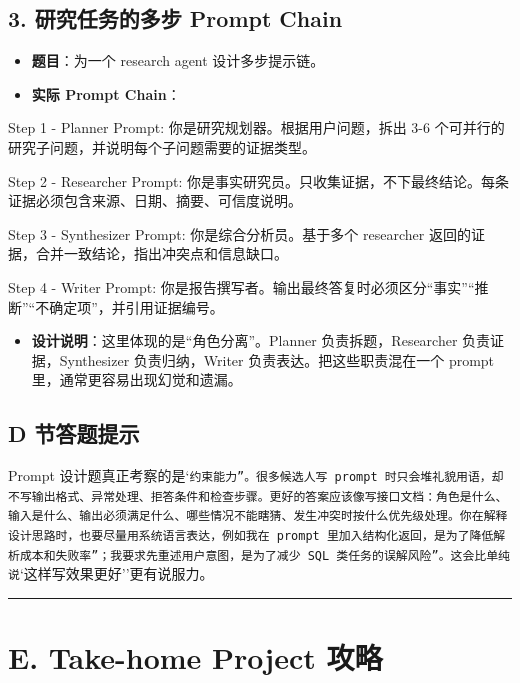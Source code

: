 \subsection{3. 研究任务的多步 Prompt Chain}
\begin{itemize}[leftmargin=2em]
\item \textbf{题目}：为一个 research agent 设计多步提示链。
\item \textbf{实际 Prompt Chain}：
\end{itemize}

\begin{codeblock}
Step 1 - Planner Prompt:
你是研究规划器。根据用户问题，拆出 3-6 个可并行的研究子问题，并说明每个子问题需要的证据类型。

Step 2 - Researcher Prompt:
你是事实研究员。只收集证据，不下最终结论。每条证据必须包含来源、日期、摘要、可信度说明。

Step 3 - Synthesizer Prompt:
你是综合分析员。基于多个 researcher 返回的证据，合并一致结论，指出冲突点和信息缺口。

Step 4 - Writer Prompt:
你是报告撰写者。输出最终答复时必须区分``事实''``推断''``不确定项''，并引用证据编号。
\end{codeblock}

\begin{itemize}[leftmargin=2em]
\item \textbf{设计说明}：这里体现的是``角色分离''。Planner 负责拆题，Researcher 负责证据，Synthesizer 负责归纳，Writer 负责表达。把这些职责混在一个 prompt 里，通常更容易出现幻觉和遗漏。
\end{itemize}

\subsection{D 节答题提示}
Prompt 设计题真正考察的是`\texttt{约束能力''。很多候选人写 prompt 时只会堆礼貌用语，却不写输出格式、异常处理、拒答条件和检查步骤。更好的答案应该像写接口文档：角色是什么、输入是什么、输出必须满足什么、哪些情况不能瞎猜、发生冲突时按什么优先级处理。你在解释设计思路时，也要尽量用系统语言表达，例如}\texttt{我在 prompt 里加入结构化返回，是为了降低解析成本和失败率''；}\texttt{我要求先重述用户意图，是为了减少 SQL 类任务的误解风险''。这会比单纯说}`这样写效果更好''更有说服力。


\bigskip\hrule\bigskip

\section{E. Take-home Project 攻略}

